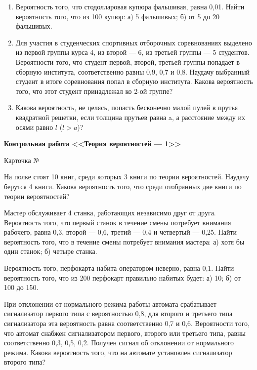 \documentclass[a4paper,14pt]{extarticle}
\newcounter{ncard}
\newcommand{\num}{\refstepcounter{ncard}\arabic{ncard}}
\begin{document}
\begin{LOOP}{10}
\begin{enumerate}
\item 
Вероятность того, что стодолларовая  купюра фальшивая, равна 0,01. Найти вероятность того, что из 100 купюр: а) 5 фальшивых; б) от 5 до 20 фальшивых.
\item 
Для участия в студенческих спортивных отборочных соревнованиях выделено из первой группы курса 4, из второй --- 6, из
третьей группы --- 5 студентов. Вероятности того, что студент первой, второй, третьей группы попадает в сборную
института, соответственно равны 0,9, 0,7 и 0,8. Наудачу выбранный студент в итоге соревнования попал в сборную
института. Какова вероятность того, что этот студент принадлежал ко 2-ой группе?

\item 
Какова вероятность, не целясь, попасть бесконечно малой пулей в прутья квадратной решетки, если толщина прутьев равна
a, а расстояние между их осями равно $l$ ($l > a$)?

\end{enumerate}

\newpage
\begin{enumerate}
{\item[]\centering \bfseries  Контрольная работа <<Теория вероятностей --- 1>> \par\vspace{1mm} Карточка № \num\par\vspace{1mm}}


\item 
На полке стоят 10 книг, среди которых 3 книги по теории вероятностей. Наудачу берутся 4 книги. Какова вероятность
того, что среди отобранных две книги по теории вероятностей?

\item 
Мастер обслуживает 4 станка, работающих независимо друг от друга. Вероятность того, что первый станок  в течение
смены потребует внимания рабочего, равна 0,3, второй --- 0,6, третий --- 0,4 и четвертый --- 0,25. Найти вероятность того,
что в течение смены потребует внимания мастера: а) хотя бы один станок; б) четыре станка.

\item 
Вероятность того, перфокарта набита оператором неверно, равна 0,1. Найти вероятность того, что из 200 перфокарт
правильно набитых будет: а) 10; б) от 100 до 150.

\item 
При отклонении от нормального режима работы автомата срабатывает сигнализатор первого типа с вероятностью 0,8, для
второго и третьего типа сигнализатора эта вероятность равна соответственно 0,7 и 0,6. Вероятности того, что автомат
снабжен сигнализатором первого, второго или третьего типа, равны соответственно 0,3, 0,5, 0,2. Получен сигнал об
отклонении от нормального режима. Какова вероятность того, что на автомате установлен сигнализатор второго типа?


\end{enumerate}
\end{LOOP}
\end{document}
